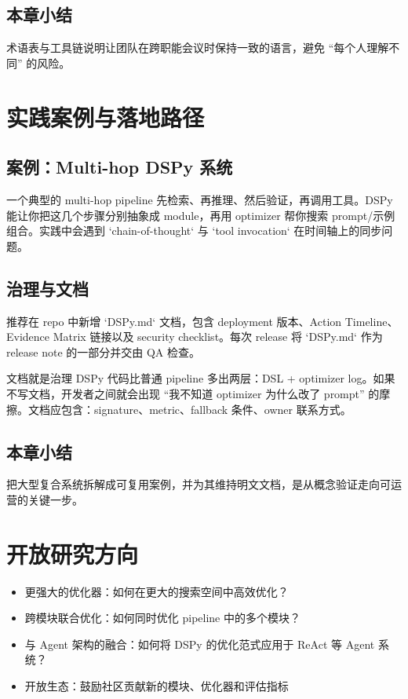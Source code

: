\documentclass[a4paper]{article}
\begin{document}
\subsection{本章小结}

术语表与工具链说明让团队在跨职能会议时保持一致的语言，避免 ``每个人理解不同'' 的风险。
\section{实践案例与落地路径}

\subsection{案例：Multi-hop DSPy 系统}

一个典型的 multi-hop pipeline 先检索、再推理、然后验证，再调用工具。DSPy 能让你把这几个步骤分别抽象成 module，再用 optimizer 帮你搜索 prompt/示例组合。实践中会遇到 `chain-of-thought` 与 `tool invocation` 在时间轴上的同步问题。

\subsection{治理与文档}

推荐在 repo 中新增 `DSPy.md` 文档，包含 deployment 版本、Action Timeline、Evidence Matrix 链接以及 security checklist。每次 release 将 `DSPy.md` 作为 release note 的一部分并交由 QA 检查。

\begin{importantbox}{文档就是治理}
DSPy 代码比普通 pipeline 多出两层：DSL + optimizer log。如果不写文档，开发者之间就会出现 ``我不知道 optimizer 为什么改了 prompt'' 的摩擦。文档应包含：signature、metric、fallback 条件、owner 联系方式。
\end{importantbox}

\subsection{本章小结}

把大型复合系统拆解成可复用案例，并为其维持明文文档，是从概念验证走向可运营的关键一步。

\section{开放研究方向}

\begin{itemize}
    \item 更强大的优化器：如何在更大的搜索空间中高效优化？
    \item 跨模块联合优化：如何同时优化 pipeline 中的多个模块？
    \item 与 Agent 架构的融合：如何将 DSPy 的优化范式应用于 ReAct 等 Agent 系统？
    \item 开放生态：鼓励社区贡献新的模块、优化器和评估指标
\end{itemize}
\end{document}
